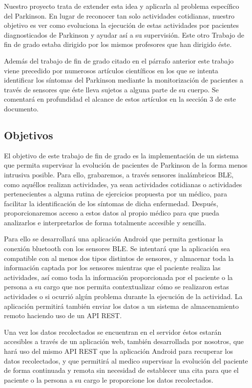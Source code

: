 \documentclass[11pt,spanish]{article}
\begin{document}
Nuestro proyecto trata de extender esta idea y aplicarla al problema específico del Parkinson. En lugar de reconocer tan solo actividades cotidianas, nuestro objetivo es ver como evoluciona la ejecución de estas actividades por pacientes diagnosticados de Parkinson y ayudar así a su supervisión. Este otro Trabajo de fin de grado estaba dirigido por los mismos profesores que han dirigido éste.
\newline

Además del trabajo de fin de grado citado en el párrafo anterior este trabajo viene precedido por numerosos artículos científicos en los que se intenta identificar los síntomas del Parkinson mediante la monitorización de pacientes a través de sensores que éste lleva sujetos a alguna parte de su cuerpo. Se comentará en profundidad el alcance de estos artículos en la sección 3 de este documento.

\subsection{Objetivos}

El objetivo de este trabajo de fin de grado es la implementación de un sistema que permita supervisar la evolución de pacientes de Parkinson de la forma menos intrusiva posible. Para ello, grabaremos, a través sensores inalámbricos BLE, como aquéllos realizan actividades, ya sean actividades cotidianas o actividades pertenecientes a alguna rutina de ejercicios propuesta por un médico, para facilitar la identificación de los síntomas de dicha enfermedad. Después, proporcionaremos acceso a estos datos al propio médico para que pueda analizarlos e interpretarlos de forma totalmente accesible y sencilla. 
\newline

Para ello se desarrollará una aplicación Android que permita gestionar la conexión bluetooth con los sensores BLE. Se intentará que la aplicación sea compatible con al menos dos tipos distintos de sensores, y almacenar toda la información captada por los sensores mientras que el paciente realiza las actividades, así como toda la información proporcionada por el paciente o la persona a su cargo que nos permita contextualizar cómo se realizaron estas actividades o si ocurrió algún problema durante la ejecución de la actividad. La aplicación permitirá también enviar los datos a un sistema de almacenamiento remoto haciendo uso de un API REST. 
\newline

Una vez los datos recolectados se encuentran en el servidor éstos estarán accesibles a través de un aplicación web, también desarrollada por nosotros, que hará uso del mismo API REST que la aplicación Android para recuperar los datos recolectados, y que permitirá al medico supervisar la evolución del paciente de forma continuada y remota sin necesidad de establecer una cita para que el paciente o la persona a su cargo le proporcione los datos recolectados. 
\newline
\end{document}
